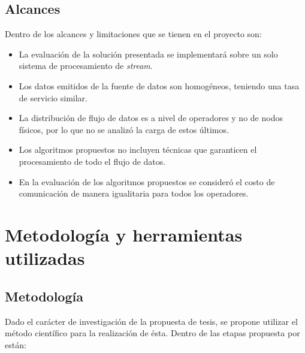 \subsection{Alcances}
Dentro de los alcances y limitaciones que se tienen en el proyecto son:
\begin{itemize}
	\item La evaluación de la solución presentada se implementará sobre un solo sistema de procesamiento de \textit{stream}.
	\item Los datos emitidos de la fuente de datos son homogéneos, teniendo una tasa de servicio similar.
	\item La distribución de flujo de datos es a nivel de operadores y no de nodos f\'isicos, por lo que no se analizó la carga de estos \'ultimos.
	\item Los algoritmos propuestos no incluyen t\'ecnicas que garanticen el procesamiento de todo el flujo de datos.
	\item En la evaluación de los algoritmos propuestos se consideró el costo de comunicación de manera igualitaria para todos los operadores.
\end{itemize}


\section{Metodología y herramientas utilizadas}
\label{intro:metodologia}

\subsection{Metodología}
Dado el carácter de investigación de la propuesta de tesis, se propone utilizar el método científico para la realización de ésta. Dentro de las etapas propuesta por \citep{hernandez2010metodologia} están:

